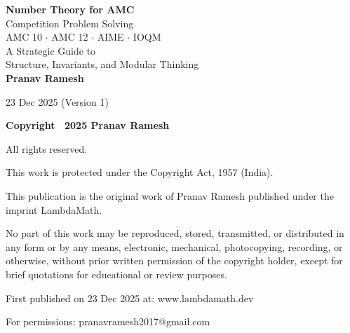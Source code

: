 \documentclass[12pt]{extarticle}
\begin{document}
\begin{titlepage}
\centering
\vspace*{2cm}

{\Huge\bfseries Number Theory for AMC}\\[0.5cm]
{\Large Competition Problem Solving}\\[2cm]

{\large AMC 10 $\cdot$ AMC 12 $\cdot$ AIME $\cdot$ IOQM}\\[3cm]

{\Large A Strategic Guide to\\[0.3cm]
Structure, Invariants, and Modular Thinking}\\[3cm]

{\Large\textbf{Pranav Ramesh}}\\[3cm]

\vfill

{\large 23 Dec 2025 (Version 1)}
\end{titlepage}

\thispagestyle{empty}
\vspace*{\fill}
\begin{center}
\textbf{\Large Copyright \textcopyright\ 2025 Pranav Ramesh}

All rights reserved.

This work is protected under the Copyright Act, 1957 (India).

\vspace{1.5cm}

This publication is the original work of Pranav Ramesh published under the imprint LambdaMath.

\vspace{1.5cm}

No part of this work may be reproduced, stored, transmitted, or distributed in any form or by any means, electronic, mechanical, photocopying, recording, or otherwise, without prior written permission of the copyright holder, except for brief quotations for educational or review purposes.

\vspace{1.5cm}

First published on 23 Dec 2025 at: www{.}lambdamath{.}dev

For permissions: pranavramesh2017@gmail{.}com
\end{center}
\vspace*{\fill}

\newpage
\end{document}
